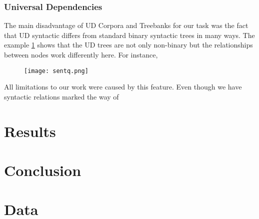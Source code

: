 \documentclass[a4paper,12pt]{article}
\begin{document}
	\subsubsection{Universal Dependencies}
    
    
    
    \par 
    The main disadvantage of UD Corpora and Treebanks for our task was the fact that UD syntactic differs from standard binary syntactic trees in many ways. The example \ref{fig:dimq} shows that the UD trees are not only non-binary but the relationships between nodes work differently here. For instance,     
    
    \begin{figure}[!h]
		\centering
        \noauthomath
		\texttt{[image: sentq.png]}
		\caption{}\label{fig:dimq}
	\end{figure}
	
    All limitations to our work were caused by this feature. Even though we have syntactic relations marked the way of 
	
    \section{Results}
	
	\section{Conclusion}
	
	\section{Data}
	
\end{document}
